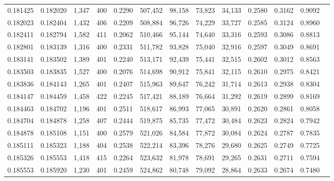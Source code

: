 \begin{tabular}{rrrrrrrrrrrrr}
0.181425 & 0.182020 & 1,347 & 400 &                                     0.2290 & 507,452 &  98,158 &  73,823 &  34,133 & 0.2580 & 0.3162 & 0.9092 \\
0.182023 & 0.182404 & 1,432 & 406 &                                     0.2209 & 508,884 &  96,726 &  74,229 &  33,727 & 0.2585 & 0.3124 & 0.8960 \\
0.182411 & 0.182794 & 1,582 & 411 &                                     0.2062 & 510,466 &  95,144 &  74,640 &  33,316 & 0.2593 & 0.3086 & 0.8813 \\
0.182801 & 0.183139 & 1,316 & 400 &                                     0.2331 & 511,782 &  93,828 &  75,040 &  32,916 & 0.2597 & 0.3049 & 0.8691 \\
0.183141 & 0.183502 & 1,389 & 401 &                                     0.2240 & 513,171 &  92,439 &  75,441 &  32,515 & 0.2602 & 0.3012 & 0.8563 \\
0.183503 & 0.183835 & 1,527 & 400 &                                     0.2076 & 514,698 &  90,912 &  75,841 &  32,115 & 0.2610 & 0.2975 & 0.8421 \\
0.183836 & 0.184143 & 1,265 & 401 &                                     0.2407 & 515,963 &  89,647 &  76,242 &  31,714 & 0.2613 & 0.2938 & 0.8304 \\
0.184147 & 0.184459 & 1,458 & 422 &                                     0.2245 & 517,421 &  88,189 &  76,664 &  31,292 & 0.2619 & 0.2899 & 0.8169 \\
0.184463 & 0.184702 & 1,196 & 401 &                                     0.2511 & 518,617 &  86,993 &  77,065 &  30,891 & 0.2620 & 0.2861 & 0.8058 \\
0.184704 & 0.184878 & 1,258 & 407 &                                     0.2444 & 519,875 &  85,735 &  77,472 &  30,484 & 0.2623 & 0.2824 & 0.7942 \\
0.184878 & 0.185108 & 1,151 & 400 &                                     0.2579 & 521,026 &  84,584 &  77,872 &  30,084 & 0.2624 & 0.2787 & 0.7835 \\
0.185111 & 0.185323 & 1,188 & 404 &                                     0.2538 & 522,214 &  83,396 &  78,276 &  29,680 & 0.2625 & 0.2749 & 0.7725 \\
0.185326 & 0.185553 & 1,418 & 415 &                                     0.2264 & 523,632 &  81,978 &  78,691 &  29,265 & 0.2631 & 0.2711 & 0.7594 \\
0.185553 & 0.185920 & 1,230 & 401 &                                     0.2459 & 524,862 &  80,748 &  79,092 &  28,864 & 0.2633 & 0.2674 & 0.7480 \\

\end{tabular}
